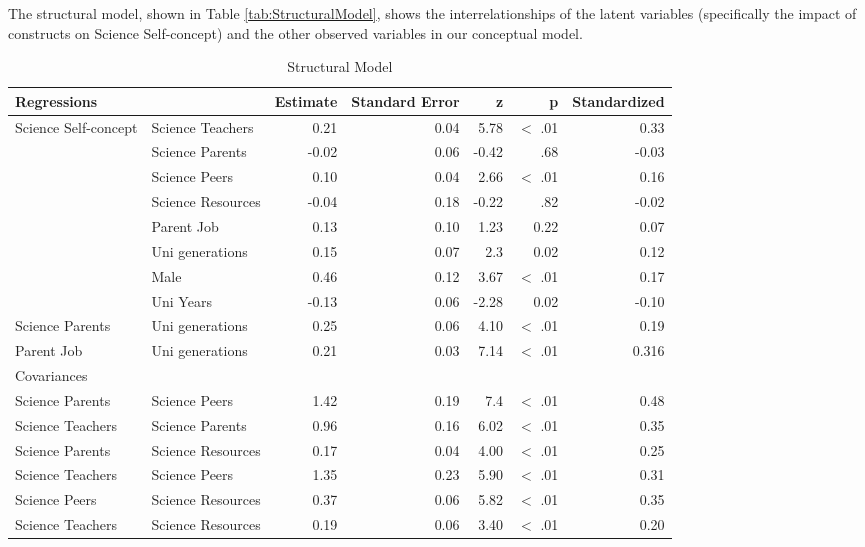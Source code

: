 The structural model, shown in Table \ref{tab:StructuralModel}, shows the interrelationships of the latent variables (specifically the impact of constructs on Science Self-concept) and the other observed variables in our conceptual model. 

\begin{table}[ht]
\caption{Structural Model} 

\centering
\begin{tabular}{llrrrrr}
  \hline
 Regressions &  & Estimate & Standard Error & z & p & Standardized \\ 
  \hline

  Science Self-concept & Science Teachers & 0.21 & 0.04 & 5.78 & $<$ .01 & 0.33 \\ 
   & Science Parents & -0.02 & 0.06 & -0.42 & .68 & -0.03 \\ 
   & Science Peers & 0.10 & 0.04 & 2.66 & $<$ .01 & 0.16 \\ 
   & Science Resources & -0.04 & 0.18 & -0.22 & .82 & -0.02 \\ 
   & Parent Job & 0.13 & 0.10 & 1.23 & 0.22 & 0.07 \\ 
   & Uni generations & 0.15 & 0.07 & 2.3 & 0.02 & 0.12 \\ 
   & Male & 0.46 & 0.12 & 3.67 & $<$ .01 & 0.17 \\ 
   & Uni Years & -0.13 & 0.06 & -2.28 & 0.02 & -0.10 \\ 
  Science Parents & Uni generations & 0.25 & 0.06 & 4.10 & $<$ .01 & 0.19 \\ 
  Parent Job & Uni generations & 0.21 & 0.03 & 7.14 & $<$ .01 & 0.316 \\ 
  \hline
Covariances &  &  &  &  & &  \\ 
  \hline
  Science Parents & Science Peers & 1.42 & 0.19 & 7.4 & $<$ .01 & 0.48 \\ 
  Science Teachers & Science Parents & 0.96 & 0.16 & 6.02 & $<$ .01 & 0.35 \\ 
  Science Parents & Science Resources & 0.17 & 0.04 & 4.00 & $<$ .01 & 0.25 \\ 
  Science Teachers & Science Peers & 1.35 & 0.23 & 5.90 & $<$ .01 & 0.31 \\ 
  Science Peers & Science Resources & 0.37 & 0.06 & 5.82 & $<$ .01 & 0.35 \\ 
  Science Teachers & Science Resources & 0.19 & 0.06 & 3.40 & $<$ .01 & 0.20 \\ 
   

\end{tabular}
\end{table}
